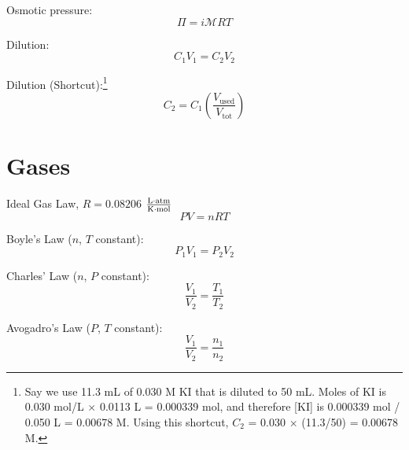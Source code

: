 \documentclass[10pt]{article}
\def\MM{\mathcal{M}}
\begin{document}
Osmotic pressure:
\begin{equation*}
\Pi=i\MM RT
\end{equation*}

Dilution:
\begin{equation*}
C_1V_1=C_2V_2
\end{equation*}

Dilution (Shortcut):\footnote{Say we use 11.3 mL of 0.030 M KI that is diluted to 50 mL. Moles of KI is 0.030 mol/L $\times$ 0.0113 L = 0.000339 mol, and therefore [KI] is 0.000339 mol / 0.050 L = 0.00678 M. Using this shortcut, $C_2$ = 0.030 $\times$ (11.3/50) = 0.00678 M.}
\begin{equation*}
C_2 = C_1 \left(\frac{V_{\text{used}}}{V_{\text{tot}}}\right)
\end{equation*}


\section{Gases}


Ideal Gas Law, $R=0.08206$ $\frac{\textnormal{L$\cdot$atm}}{\textnormal{K$\cdot$mol}}$
\begin{equation*}
PV=nRT
\end{equation*}

Boyle's Law ($n$, $T$ constant):
\begin{equation*}
P_1V_1=P_2V_2
\end{equation*}

Charles' Law ($n$, $P$ constant):
\begin{equation*}
\frac{V_1}{V_2} = \frac{T_1}{T_2} 
\end{equation*}

Avogadro's Law ($P$, $T$ constant):
\begin{equation*}
\frac{V_1}{V_2} = \frac{n_1}{n_2} 
\end{equation*}
\end{document}
